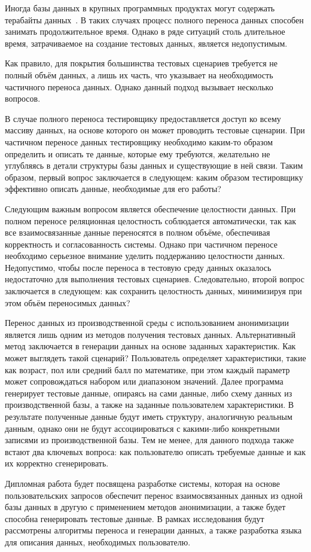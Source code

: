 Иногда базы данных в крупных программных продуктах могут содержать терабайты данных~\cite{pg-big-data-example}. В таких случаях процесс полного переноса данных способен занимать продолжительное время. Однако в ряде ситуаций столь длительное время, затрачиваемое на создание тестовых данных, является недопустимым.

Как правило, для покрытия большинства тестовых сценариев требуется не полный объём данных, а лишь их часть, что указывает на необходимость частичного переноса данных. Однако данный подход вызывает несколько вопросов.

В случае полного переноса тестировщику предоставляется доступ ко всему массиву данных, на основе которого он может проводить тестовые сценарии. При частичном переносе данных тестировщику необходимо каким-то образом определить и описать те данные, которые ему требуются, желательно не углубляясь в детали структуры базы данных и существующие в ней связи. Таким образом, первый вопрос заключается в следующем: каким образом тестировщику эффективно описать данные, необходимые для его работы?

Следующим важным вопросом является обеспечение целостности данных. При полном переносе реляционная целостность соблюдается автоматически, так как все взаимосвязанные данные переносятся в полном объёме, обеспечивая корректность и согласованность системы. Однако при частичном переносе необходимо серьезное внимание уделить поддержанию целостности данных. Недопустимо, чтобы после переноса в тестовую среду данных оказалось недостаточно для выполнения тестовых сценариев. Следовательно, второй вопрос заключается в следующем: как сохранить целостность данных, минимизируя при этом объём переносимых данных?

Перенос данных из производственной среды с использованием анонимизации является лишь одним из методов получения тестовых данных. Альтернативный метод заключается в генерации данных на основе заданных характеристик. Как может выглядеть такой сценарий? Пользователь определяет характеристики, такие как возраст, пол или средний балл по математике, при этом каждый параметр может сопровождаться набором или диапазоном значений. Далее программа генерирует тестовые данные, опираясь на сами данные, либо схему данных из производственной базы, а также на заданные пользователем характеристики. В результате полученные данные будут иметь структуру, аналогичную реальным данным, однако они не будут ассоциироваться с какими-либо конкретными записями из производственной базы. Тем не менее, для данного подхода также встают два ключевых вопроса: как пользователю описать требуемые данные и как их корректно сгенерировать.

Дипломная работа будет посвящена разработке системы, которая на основе пользовательских запросов обеспечит перенос взаимосвязанных данных из одной базы данных в другую с применением методов анонимизации, а также будет способна генерировать тестовые данные. В рамках исследования будут рассмотрены алгоритмы переноса и генерации данных, а также разработка языка для описания данных, необходимых пользователю.
